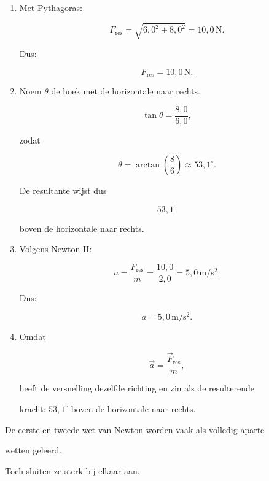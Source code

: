 \documentclass{ximera}
\begin{document}
\begin{oefening}{\oefU\ESS}
\begin{oplossing}
\begin{enumerate}
  \item Met Pythagoras:

  \[F_{\mathrm{res}} = \sqrt{6{,}0^2+8{,}0^2} = 10{,}0\,\mathrm N.\]

  Dus:

  \[\boxed{F_{\mathrm{res}}=10{,}0\,\mathrm N}.\]

  \item Noem $\theta$ de hoek met de horizontale naar rechts.

  \[\tan\theta=\frac{8{,}0}{6{,}0},\]

  zodat

  \[\theta=\arctan\left(\frac{8}{6}\right) \approx53{,}1^\circ.\]

  De resultante wijst dus

  \[\boxed{53{,}1^\circ}\]

  boven de horizontale naar rechts.

  \item Volgens Newton II:

  \[a=\frac{F_{\mathrm{res}}}{m} =\frac{10{,}0}{2{,}0} =5{,}0\,\mathrm{m/s^2}.\]

  Dus:

  \[\boxed{a=5{,}0\,\mathrm{m/s^2}}.\]

  \item Omdat

  \[\vec a=\frac{\vec F_{\mathrm{res}}}{m},\]

  heeft de versnelling dezelfde richting en zin als de resulterende

  kracht: $53{,}1^\circ$ boven de horizontale naar rechts.

\end{enumerate}

\end{oplossing}

\end{oefening}






De eerste en tweede wet van Newton worden vaak als volledig aparte

wetten geleerd.

Toch sluiten ze sterk bij elkaar aan.
\end{document}
